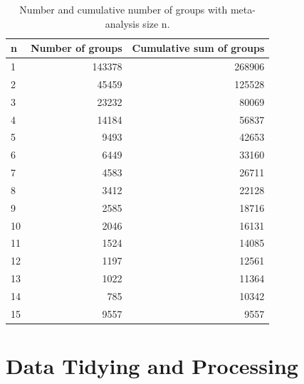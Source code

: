 \documentclass[11pt,a4paper,twoside]{book}\usepackage[]{graphicx}\usepackage[]{color}
\makeatletter
\newenvironment{kframe}{%
 \def\at@end@of@kframe{}%
 \ifinner\ifhmode%
  \def\at@end@of@kframe{\end{minipage}}%
  \begin{minipage}{\columnwidth}%
 \fi\fi%
 \def\FrameCommand##1{\hskip\@totalleftmargin \hskip-\fboxsep
 \colorbox{shadecolor}{##1}\hskip-\fboxsep
     \hskip-\linewidth \hskip-\@totalleftmargin \hskip\columnwidth}%
 \MakeFramed {\advance\hsize-\width
   \@totalleftmargin\z@ \linewidth\hsize
   \@setminipage}}%
 {\par\unskip\endMakeFramed%
 \at@end@of@kframe}
\makeatother
\begin{document}
\begin{kframe}


{\ttfamily\noindent\color{warningcolor}{\#\# Warning: Setting row names on a tibble is deprecated.}}\end{kframe}%
\begin{table}[ht]
\centering
\begingroup\footnotesize
\begin{tabular}{lrr}
  \hline
n & Number of groups & Cumulative sum of groups \\ 
  \hline
1 & 143378 & 268906 \\ 
  2 & 45459 & 125528 \\ 
  3 & 23232 & 80069 \\ 
  4 & 14184 & 56837 \\ 
  5 & 9493 & 42653 \\ 
  6 & 6449 & 33160 \\ 
  7 & 4583 & 26711 \\ 
  8 & 3412 & 22128 \\ 
  9 & 2585 & 18716 \\ 
  10 & 2046 & 16131 \\ 
  11 & 1524 & 14085 \\ 
  12 & 1197 & 12561 \\ 
  13 & 1022 & 11364 \\ 
  14 & 785 & 10342 \\ 
  15 & 9557 & 9557 \\ 
   \hline
\end{tabular}
\endgroup
\caption{Number and cumulative number of groups with meta-analysis size n.} 
\label{repr.groups}
\end{table}


\section{Data Tidying and Processing} \label{sec:Processing}
\end{document}
